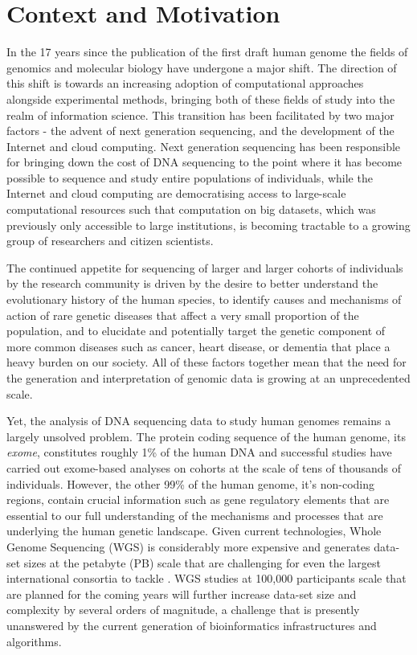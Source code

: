 \section{Context and Motivation}
In the 17 years since the publication of the first draft human genome\autocite{lander2001initial} the fields of genomics and molecular biology have undergone a major shift. The direction of this shift is towards an increasing adoption of computational approaches alongside experimental methods, bringing both of these fields of study into the realm of information science. This transition has been facilitated by two major factors - the advent of next generation sequencing\autocite{schuster2007next}, and the development of the Internet and cloud computing\autocite{buyya2009cloud}. Next generation sequencing has been responsible for bringing down the cost of DNA sequencing to the point where it has become possible to sequence and study entire populations of individuals\autocite{gudbjartsson2015large}, while the Internet and cloud computing are democratising access to large-scale computational resources such that computation on big datasets, which was previously only accessible to large institutions, is becoming tractable to a growing group of researchers and citizen scientists.

The continued appetite for sequencing of larger and larger cohorts of individuals by the research community is driven by the desire to better understand the evolutionary history of the human species\autocite{jobling2013human}, to identify causes and mechanisms of action of rare genetic diseases that affect a very small proportion of the population\autocite{boycott2013rare}, and to elucidate and potentially target the genetic component of more common diseases such as cancer\autocite{weinstein2013cancer}, heart disease\autocite{bruneau2008developmental}, or dementia\autocite{selkoe1996amyloid} that place a heavy burden on our society. All of these factors together mean that the need for the generation and interpretation of genomic data is growing at an unprecedented scale.

Yet, the analysis of DNA sequencing data to study human genomes remains a largely unsolved problem. The protein coding sequence of the human genome, its \emph{exome}, constitutes roughly 1\% of the human DNA and successful studies have carried out exome-based analyses on cohorts at the scale of tens of thousands of individuals\autocite{lek2016analysis}. However, the other 99\% of the human genome, it's non-coding regions, contain crucial information such as gene regulatory elements\autocite{encode2012integrated} that are essential to our full understanding of the mechanisms and processes that are underlying the human genetic landscape. Given current technologies, Whole Genome Sequencing (WGS) is considerably more expensive and generates data-set sizes at the petabyte (PB) scale that are challenging for even the largest international consortia to tackle \autocite{stein2015data}. WGS studies at 100,000 participants scale that are planned for the coming years\autocite{england2016100} will further increase data-set size and complexity by several orders of magnitude, a challenge that is presently unanswered by the current generation of bioinformatics infrastructures and algorithms.  


